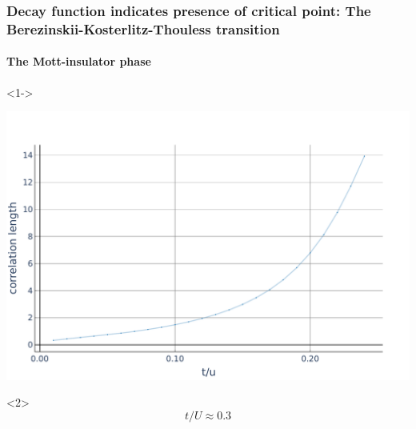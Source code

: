\documentclass[aspectratio=169]{beamer}
\begin{document}
\begin{frame}
\begin{onlyenv}
\begin{center}
    \end{center}
  \end{onlyenv}
\end{frame}

\begin{frame}
  \frametitle{Decay function indicates presence of critical point: The Berezinskii-Kosterlitz-Thouless transition}
  \framesubtitle{The Mott-insulator phase}
  \begin{onlyenv}<1->
    \begin{center}
      \includegraphics[scale=0.22]{../img/Correlations-length-values.pdf}
    \end{center}
  \end{onlyenv}
  \begin{onlyenv}<2>
    \begin{equation}
      t/U \approx 0.3
    \end{equation}
  \end{onlyenv}
\end{frame}
\end{document}
